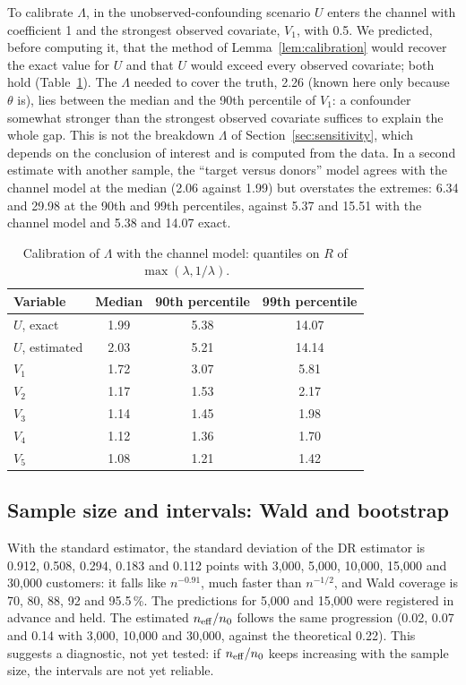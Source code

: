 To calibrate $\Lambda$, in the unobserved-confounding scenario $U$ enters the channel with coefficient 1 and the strongest observed covariate, $V_1$, with 0.5. We predicted, before computing it, that the method of Lemma~\ref{lem:calibration} would recover the exact value for $U$ and that $U$ would exceed every observed covariate; both hold (Table~\ref{tab:calibration}). The $\Lambda$ needed to cover the truth, 2.26 (known here only because $\theta$ is), lies between the median and the 90th percentile of $V_1$: a confounder somewhat stronger than the strongest observed covariate suffices to explain the whole gap. This is not the breakdown $\Lambda$ of Section~\ref{sec:sensitivity}, which depends on the conclusion of interest and is computed from the data. In a second estimate with another sample, the ``target versus donors'' model agrees with the channel model at the median (2.06 against 1.99) but overstates the extremes: 6.34 and 29.98 at the 90th and 99th percentiles, against 5.37 and 15.51 with the channel model and 5.38 and 14.07 exact.

\begin{table}[ht]
\centering\small
\caption{Calibration of $\Lambda$ with the channel model: quantiles on $R$ of $\max(\lambda,1/\lambda)$.}\label{tab:calibration}
\begin{tabular}{@{}lccc@{}}
\toprule
Variable & Median & 90th percentile & 99th percentile \\
\midrule
$U$, exact & 1.99 & 5.38 & 14.07 \\
$U$, estimated & 2.03 & 5.21 & 14.14 \\
$V_1$ & 1.72 & 3.07 & 5.81 \\
$V_2$ & 1.17 & 1.53 & 2.17 \\
$V_3$ & 1.14 & 1.45 & 1.98 \\
$V_4$ & 1.12 & 1.36 & 1.70 \\
$V_5$ & 1.08 & 1.21 & 1.42 \\
\bottomrule
\end{tabular}
\end{table}

\subsection{Sample size and intervals: Wald and bootstrap}\label{sec:res-bootstrap}

With the standard estimator, the standard deviation of the DR estimator is 0.912, 0.508, 0.294, 0.183 and 0.112 points with 3{,}000, 5{,}000, 10{,}000, 15{,}000 and 30{,}000 customers: it falls like $n^{-0.91}$, much faster than $n^{-1/2}$, and Wald coverage is 70, 80, 88, 92 and 95.5\,\%. The predictions for 5{,}000 and 15{,}000 were registered in advance and held. The estimated $n_{\mathrm{eff}}/n_0$ follows the same progression (0.02, 0.07 and 0.14 with 3{,}000, 10{,}000 and 30{,}000, against the theoretical 0.22). This suggests a diagnostic, not yet tested: if $n_{\mathrm{eff}}/n_0$ keeps increasing with the sample size, the intervals are not yet reliable.

